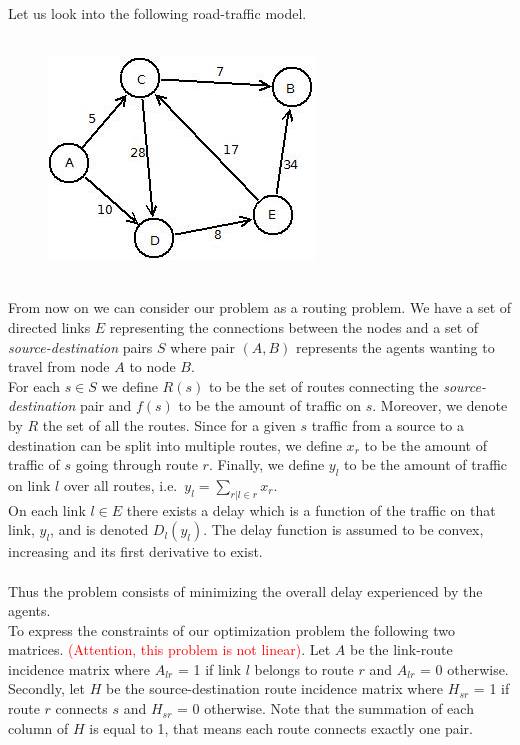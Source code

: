Let us look into the following road-traffic model.\\\\
\begin{figure}[h!]
\centering
\includegraphics[scale=.7]{FIG1.jpeg}
\label{fig:1}
\end{figure}\\
From now on we can consider our problem as a routing problem.
We have a set of directed links $E$ representing the connections between the nodes and a set of \textit{source-destination} pairs $S$ where pair $(A,B)$ represents the agents wanting to travel from node $A$ to node $B$.\\
For each $s \in S$ we define $R(s)$ to be the set of routes connecting the \textit{source-destination} pair and $f(s)$ to be the amount of traffic on $s$. Moreover, we denote by $R$ the set of all the routes. Since for a given $s$ traffic from a source to a destination can be split into multiple routes, we define $x_r$ to be the amount of traffic of $s$ going through route $r$. Finally, we define $y_l$ to be the amount of traffic on link $l$ over all routes, i.e.~$y_l=\sum_{r | l \in r} x_r$.\\
On each link $l \in E$ there exists a delay which is a function of the traffic on that link, $y_l$, and is denoted $ D_l(y_l)$.  The delay function  is assumed to be convex, increasing and its first derivative to exist.\\\\
Thus the problem consists of minimizing the overall delay experienced by the agents.\\
To express the constraints of our optimization problem the following two matrices. \textcolor{red}{(Attention, this problem is not linear)}. Let $A$ be the link-route incidence matrix where $A_{lr}$ = 1 if link $l$ belongs to route $r$ and $A_{lr}$ = 0 otherwise. Secondly, let $H$ be the source-destination route incidence matrix where $H_{sr}$ = 1 if route $r$ connects $s$ and $H_{sr}$ = 0 otherwise.  Note that the summation of each column of $H$ is equal to 1, that means each route connects exactly one pair.\\\\
